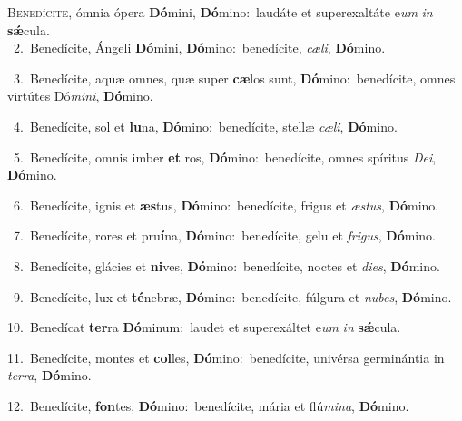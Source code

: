 \lettrine{\initial\textcolor{\initialcolor}{B}}{enedícite,} ómnia ópera \textbf{Dó}\-mini, \textbf{Dó}\-mino:~\star laudáte et superexaltáte e\textit{um} \textit{in} \textbf{sǽ}\-cula.\\
{\numbfont\textcolor{\numbcolor}{~2.}}~Benedícite, Ángeli \textbf{Dó}\-mini, \textbf{Dó}\-mino:~\star benedícite, \textit{cæ}\-\textit{li}, \textbf{Dó}\-mino.\par
{\numbfont\textcolor{\numbcolor}{~3.}}~Benedícite, aquæ omnes, quæ super \textbf{cæ}\-los sunt, \textbf{Dó}\-mino:~\star benedícite, omnes virtútes Dó\-\textit{mi}\-\textit{ni}, \textbf{Dó}\-mino.\par
{\numbfont\textcolor{\numbcolor}{~4.}}~Benedícite, sol et \textbf{lu}\-na, \textbf{Dó}\-mino:~\star benedícite, stellæ \textit{cæ}\-\textit{li}, \textbf{Dó}\-mino.\par
{\numbfont\textcolor{\numbcolor}{~5.}}~Benedícite, omnis imber \textbf{et} ros, \textbf{Dó}\-mino:~\star benedícite, omnes spíritus \textit{De}\-\textit{i}, \textbf{Dó}\-mino.\par
{\numbfont\textcolor{\numbcolor}{~6.}}~Benedícite, ignis et \textbf{æs}\-tus, \textbf{Dó}\-mino:~\star benedícite, frigus et \textit{æs}\-\textit{tus}, \textbf{Dó}\-mino.\par
{\numbfont\textcolor{\numbcolor}{~7.}}~Benedícite, rores et pru\-\textbf{í}\-na, \textbf{Dó}\-mino:~\star benedícite, gelu et \textit{fri}\-\textit{gus}, \textbf{Dó}\-mino.\par
{\numbfont\textcolor{\numbcolor}{~8.}}~Benedícite, glácies et \textbf{ni}\-ves, \textbf{Dó}\-mino:~\star benedícite, noctes et \textit{di}\-\textit{es}, \textbf{Dó}\-mino.\par
{\numbfont\textcolor{\numbcolor}{~9.}}~Benedícite, lux et \textbf{té}\-nebræ, \textbf{Dó}\-mino:~\star benedícite, fúlgura et \textit{nu}\-\textit{bes}, \textbf{Dó}\-mino.\par
{\numbfont\textcolor{\numbcolor}{10.}}~Benedícat \textbf{ter}\-ra \textbf{Dó}\-minum:~\star laudet et superexáltet e\textit{um} \textit{in} \textbf{sǽ}\-cula.\par
{\numbfont\textcolor{\numbcolor}{11.}}~Benedícite, montes et \textbf{col}\-les, \textbf{Dó}\-mino:~\star benedícite, univérsa germinántia in \textit{ter}\-\textit{ra}, \textbf{Dó}\-mino.\par
{\numbfont\textcolor{\numbcolor}{12.}}~Benedícite, \textbf{fon}\-tes, \textbf{Dó}\-mino:~\star benedícite, mária et flú\-\textit{mi}\-\textit{na}, \textbf{Dó}\-mino.\par
